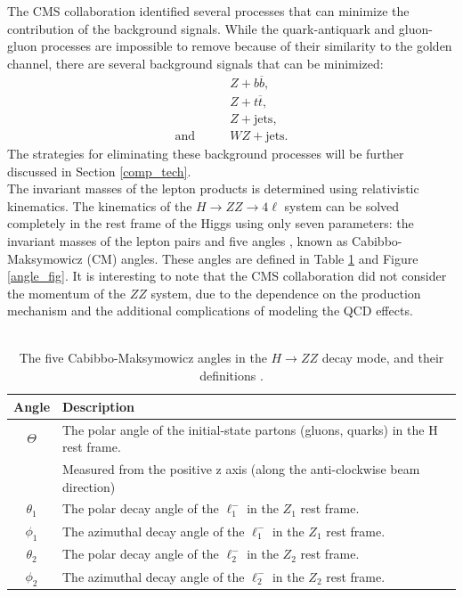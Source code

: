 \documentclass[12pt]{article}
\newcommand{\npar}{\\[0.5cm] \noindent}
\begin{document}
The CMS collaboration identified several processes that can minimize the contribution of the background signals. While the quark-antiquark and gluon-gluon processes are impossible to remove because of their similarity to the golden channel, there are several background signals that can be minimized\cite{new_higgs}:
\begin{align}
& Z + b \overline{b}, \\
& Z + t \overline{t}, \\
& Z + \text{jets}, \\
\text{and} \qquad & WZ + \text{jets} .
\end{align}
The strategies for eliminating these background processes will be further discussed in Section \ref*{comp_tech}.
\npar
The invariant masses of the lepton products is determined using relativistic kinematics. The kinematics of the $H \to ZZ \to 4 \ell$ system can be solved completely in the rest frame of the Higgs using only seven parameters: the invariant masses of the lepton pairs and five angles \cite{new_higgs}, known as Cabibbo-Maksymowicz (CM) angles\cite{higgs_angles}. These angles are defined in Table \ref{angle_table} and Figure \ref{angle_fig}. It is interesting to note that the CMS collaboration did not consider the momentum of the $ZZ$ system, due to the dependence on the production mechanism and the additional complications of modeling the QCD effects\cite{new_higgs}. \\ \\
\begin{table}[h!]
\centering
\begin{tabular}{|c|l|}
\hline
Angle & Description \\ \hline \hline
$\Theta$ & The polar angle of the initial-state partons (gluons, quarks) in the H rest frame. \\ & Measured from the positive z axis (along the anti-clockwise beam direction) \\ \hline
$\theta_1$ & The polar decay angle of the $\ell_1^-$ in the $Z_1$ rest frame. \\ \hline
$\phi_1$ & The azimuthal decay angle of the $\ell_1^-$ in the $Z_1$ rest frame. \\ \hline  
$\theta_2$ & The polar decay angle of the $\ell_2^-$ in the $Z_2$ rest frame. \\ \hline
$\phi_2$ &  The azimuthal decay angle of the $\ell_2^-$ in the $Z_2$ rest frame. \\ \hline
\end{tabular}
\caption{The five Cabibbo-Maksymowicz angles in the $H \to ZZ$ decay mode, and their definitions \cite{higgs_angles}.}
\label{angle_table}
\end{table}
\end{document}
